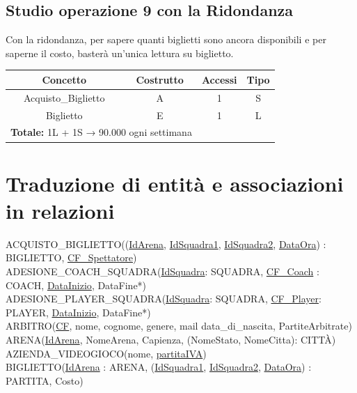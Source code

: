 \documentclass[a4paper,12pt]{report}
\begin{document}
\subsection*{Studio operazione 9 con la Ridondanza}
Con la ridondanza, per sapere quanti biglietti sono ancora disponibili e per saperne il costo, basterà un'unica lettura su biglietto.
\begin{center}
	\begin{tabular}{|c|c|c|c|}
		\hline\rowcolor{pink}
		Concetto & Costrutto & Accessi & Tipo\\
		\hline\hline		
		Acquisto\_Biglietto & A & 1 & S\\
		Biglietto & E & 1 & L\\		
		\hline
		\hline
		\multicolumn{2}{l}{%
			\textbf{Totale:} 1L + 1S → 90.000 ogni settimana} \\
		\hline
	\end{tabular}
\end{center}
\section{Traduzione di entità e associazioni in relazioni}

ACQUISTO\_BIGLIETTO((\underline{IdArena}, \underline{IdSquadra1}, \underline{IdSquadra2}, \underline{DataOra}) : BIGLIETTO, \underline{CF\_Spettatore}) \\

\noindent ADESIONE\_COACH\_SQUADRA(\underline{IdSquadra}: SQUADRA, \underline{CF\_Coach} : COACH, \underline{DataInizio}, DataFine*) \\

\noindent ADESIONE\_PLAYER\_SQUADRA(\underline{IdSquadra}: SQUADRA, \underline{CF\_Player}: PLAYER, \underline{DataInizio}, DataFine*) \\

\noindent ARBITRO(\underline{CF}, nome, cognome, genere, mail data\_di\_nascita, PartiteArbitrate) \\

\noindent ARENA(\underline{IdArena}, NomeArena, Capienza, (NomeStato, NomeCitta): CITTÀ) \\

\noindent AZIENDA\_VIDEOGIOCO(nome, \underline{partitaIVA}) \\

\noindent BIGLIETTO(\underline{IdArena} : ARENA, (\underline{IdSquadra1}, \underline{IdSquadra2}, \underline{DataOra}) : PARTITA, Costo) \\
\end{document}
